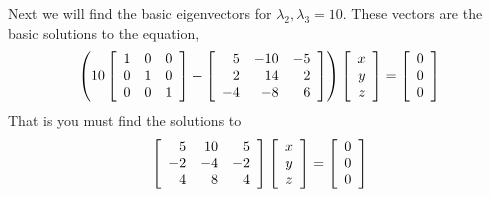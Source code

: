 \begin{solution}
Next we will find the basic eigenvectors for $\lambda_2, \lambda_3=10.$ These vectors are the basic 
solutions to the equation,
\begin{equation*}
\left( 10\left[
\begin{array}{rrr}
1 & 0 & 0 \\
0 & 1 & 0 \\
0 & 0 & 1
\end{array}
\right] - \left[
\begin{array}{rrr}
5 & -10 & -5 \\
2 & 14 & 2 \\
-4 & -8 & 6
\end{array}
\right]  \right) \left[
\begin{array}{r}
x \\
y \\
z
\end{array}
\right] =\left[
\begin{array}{r}
0 \\
0 \\
0
\end{array}
\right]
\end{equation*}
That is you must find the solutions to
\begin{equation*}
\left[
\begin{array}{rrr}
5 & 10 & 5 \\
 -2 &  -4  & -2 \\
4 & 8  & 4
\end{array}
\right] \left[
\begin{array}{c}
x \\
y \\
z
\end{array}
\right] =\left[
\begin{array}{r}
0 \\
0 \\
0
\end{array}
\right]
\end{equation*}


\end{solution}
